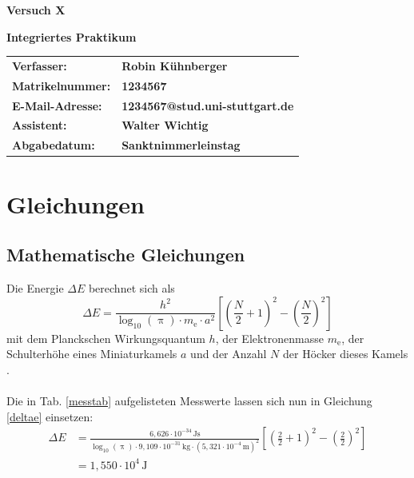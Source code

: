 \documentclass[12pt]{scrartcl} %
\begin{document}
\begin{titlepage}
  \begin{center}
    \vspace*{2cm}
    \begin{LARGE}
      \vspace*{1cm}
      \textbf{\textsf{Versuch X\\}}
    \end{LARGE}
    \vspace*{1cm}
    \textbf{\textsf{Integriertes Praktikum}}\\
    \vspace*{1.5cm}
    \begin{table}[H]
      \sffamily
      \hspace*{3cm}
      \begin{tabular}{>{\bfseries}l>{\bfseries}l}
        Verfasser: & Robin Kühnberger\\
        Matrikelnummer: & 1234567\\
        E-Mail-Adresse: & 1234567@stud.uni-stuttgart.de\\
        Assistent: & Walter Wichtig\\
        Abgabedatum: & Sanktnimmerleinstag\\
      \end{tabular}
    \end{table}
  \end{center}
\end{titlepage}
\renewcommand{\thepage}{\Roman{page}}\setcounter{page}{1}
\tableofcontents %
\newpage
\renewcommand{\thepage}{\arabic{page}}\setcounter{page}{1}
\section{Gleichungen}
\subsection{Mathematische Gleichungen}
Die Energie $\Delta E$ berechnet sich als
\begin{equation}
  \Delta E = \frac{h^2}{\log_{10}(\uppi) \cdot m_\mathrm{e} \cdot a^2}\left[\left(\frac{N}{2}+1\right)^2-\left(\frac{N}{2}\right)^2\right] \label{deltae}
\end{equation} %
mit dem Planckschen Wirkungsquantum $h$, der Elektronenmasse $m_\mathrm{e}$, der Schulterhöhe eines Miniaturkamels $a$ und der Anzahl $N$ der Höcker dieses Kamels \cite{mbuch}.\\
\\
Die in Tab. \ref{messtab} aufgelisteten Messwerte lassen sich nun in Gleichung \ref{deltae} einsetzen:
\begin{align*}
  \Delta E & = \frac{6,626\cdot 10^{-34} \, \mathrm{Js}}{\log_{10}(\uppi) \cdot 9,109 \cdot 10^{-31}\, \mathrm{kg} \cdot (5,321\cdot 10^{-4}\, \mathrm{m})^2}\left[\left(\frac{2}{2}+1\right)^2-\left(\frac{2}{2}\right)^2\right]\\
  & = 1,550 \cdot 10^4 \,\mathrm{J}
\end{align*} %
\end{document}
